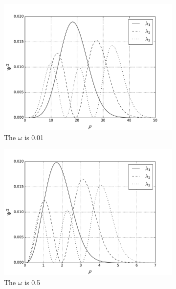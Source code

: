 \documentclass[10pt]{article}
\begin{document}
\begin{figure}[h!] 
  \begin{subfigure}[b]{0.6\linewidth}
    \centering
    \includegraphics[width=1.1\linewidth]{two_001} 
    \caption{The $\omega$ is 0.01} 
    \label{fig1:a} 
    \vspace{1ex}
  \end{subfigure}%
  \begin{subfigure}[b]{0.6\linewidth}
    \centering
    \includegraphics[width=1.1\linewidth]{two_05} 
    \caption{The $\omega$ is 0.5} 
    \label{fig1:b} 
    \vspace{1ex}
  \end{subfigure} 
  \begin{subfigure}[b]{0.6\linewidth}

\end{subfigure}
\end{figure}
\end{document}
